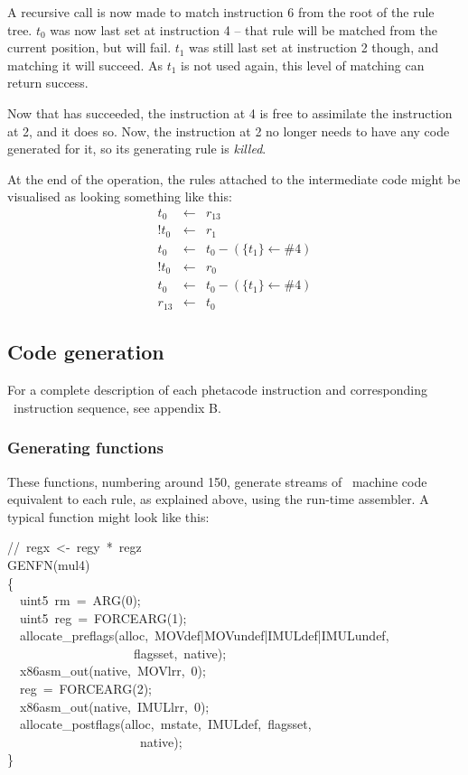 A recursive call is now made to match instruction 6 from the root of the rule tree. $t_0$ was now last set at instruction 4 -- that rule will be matched from the current position, but will fail. $t_1$ was still last set at instruction 2 though, and matching it will succeed. As $t_1$ is not used again, this level of matching can return success.

Now that has succeeded, the instruction at 4 is free to assimilate the instruction at 2, and it does so. Now, the instruction at 2 no longer needs to have any code generated for it, so its generating rule is {\it killed}.

At the end of the operation, the rules attached to the intermediate code might be visualised as looking something like this:
\begin{eqnarray*}
t_0 & \leftarrow & r_{13}\\
!t_0 & \leftarrow & r_1\\
t_0 & \leftarrow & t_0 - (\{t_1\} \leftarrow \#4)\\
!t_0 & \leftarrow & r_0\\
t_0 & \leftarrow & t_0 - (\{t_1\} \leftarrow \#4)\\
r_{13} & \leftarrow & t_0
\end{eqnarray*}

\subsection{Code generation}

For a complete description of each phetacode instruction and corresponding \ia\ instruction sequence, see appendix B.

\subsubsection{Generating functions}

These functions, numbering around 150, generate streams of \ia\ machine code equivalent to each rule, as explained above, using the run-time assembler. A typical function might look like this:

\begin{code}
//~regx~<-~regy~*~regz\\
GENFN(mul4)\\
\{\\
~~uint5~rm~=~ARG(0);\\
~~uint5~reg~=~FORCEARG(1);\\
~~allocate\_preflags(alloc,~MOVdef|MOVundef|IMULdef|IMULundef,\\
~~~~~~~~~~~~~~~~~~~~flagsset,~native);\\
~~x86asm\_out(native,~MOVlrr,~0);\\
~~reg~=~FORCEARG(2);\\
~~x86asm\_out(native,~IMULlrr,~0);\\
~~allocate\_postflags(alloc,~mstate,~IMULdef,~flagsset,\\
~~~~~~~~~~~~~~~~~~~~~native);\\
\}
\end{code}

